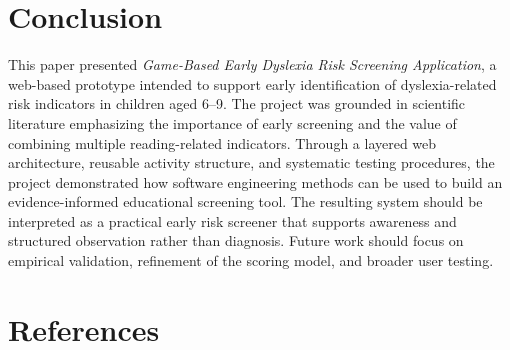 \documentclass[conference]{IEEEtran}
\begin{document}
\section{Conclusion}

This paper presented \textit{Game-Based Early Dyslexia Risk Screening Application}, a web-based prototype intended to support early identification of dyslexia-related risk indicators in children aged 6--9. The project was grounded in scientific literature emphasizing the importance of early screening and the value of combining multiple reading-related indicators. Through a layered web architecture, reusable activity structure, and systematic testing procedures, the project demonstrated how software engineering methods can be used to build an evidence-informed educational screening tool. The resulting system should be interpreted as a practical early risk screener that supports awareness and structured observation rather than diagnosis. Future work should focus on empirical validation, refinement of the scoring model, and broader user testing.

\section*{References}
\end{document}
